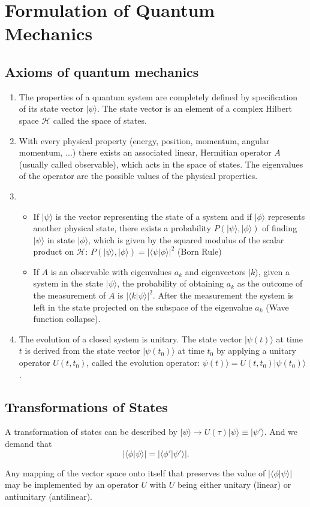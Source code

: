 \chapter{Formulation of Quantum Mechanics}
\section{Axioms of quantum mechanics}
\begin{enumerate}
\item  The properties of a quantum system are completely defined by specification of its state vector $|\psi\rangle$. The state vector is an element of a complex Hilbert space $\mathcal{H}$ called the space of states.
\item With every physical property (energy, position, momentum, angular momentum, ...) there exists an associated linear, Hermitian operator $A$ (usually called observable), which acts in the space of states. The eigenvalues of the operator are the possible values of the physical properties.
\item 
\begin{itemize}
\item  If $|\psi\rangle$ is the vector representing the state of a system and if $|\phi\rangle$ represents another physical state, there exists a probability $P(|\psi\rangle,|\phi\rangle)$ of finding $|\psi\rangle$ in state $|\phi\rangle$, which is given by the squared modulus of the scalar product on $\mathcal{H}: \, P(|\psi\rangle,|\phi\rangle) = |\langle \psi | \phi \rangle|^2$ (Born Rule)
\item If $A$ is an observable with eigenvalues $a_k$ and eigenvectors $|k\rangle$, given a system in the state $|\psi\rangle$, the probability of obtaining $a_k$ as the outcome of the measurement of $A$ is $|\langle k | \psi \rangle|^2$. After the measurement
the system is left in the state projected on the subspace of the eigenvalue $a_k$ (Wave function collapse).
\end{itemize}
\item The evolution of a closed system is unitary. The state vector $|\psi(t)\rangle$ at time $t$ is derived from the state vector $|\psi(t_0)\rangle$ at time $t_0$ by applying a unitary operator $U(t,t_0)$, called the evolution operator: $\psi(t)\rangle = U(t,t_0) |\psi(t_0)\rangle$.
\end{enumerate}

\section{Transformations of States}
A transformation of states can be described by $|\psi\rangle \to U(\tau) | \psi \rangle \equiv | \psi' \rangle$. And we demand that
\[|\langle \phi | \psi \rangle| = |\langle \phi' | \psi' \rangle|.\]
\begin{newthem}
Any mapping of the vector space onto itself that preserves the value of $|\langle \phi | \psi \rangle|$ may be implemented by an operator $U$ with $U$ being either unitary (linear) or antiunitary (antilinear).
\end{newthem}

